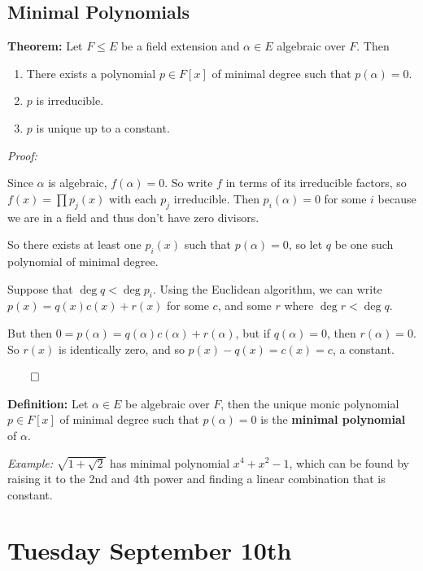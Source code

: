 \hypertarget{minimal-polynomials}{%
\subsection{Minimal Polynomials}\label{minimal-polynomials}}

\textbf{Theorem:} Let \(F\leq E\) be a field extension and
\(\alpha \in E\) algebraic over \(F\). Then

\begin{enumerate}
\def\labelenumi{\arabic{enumi}.}
\item
  There exists a polynomial \(p\in F[x]\) of minimal degree such that
  \(p(\alpha) = 0\).
\item
  \(p\) is irreducible.
\item
  \(p\) is unique up to a constant.
\end{enumerate}

\emph{Proof:}

Since \(\alpha\) is algebraic, \(f(\alpha) = 0\). So write \(f\) in
terms of its irreducible factors, so \(f(x) = \prod p_j(x)\) with each
\(p_j\) irreducible. Then \(p_i(\alpha) = 0\) for some \(i\) because we
are in a field and thus don't have zero divisors.

So there exists at least one \(p_i(x)\) such that \(p(\alpha) = 0\), so
let \(q\) be one such polynomial of minimal degree.

Suppose that \(\deg q < \deg p_i\). Using the Euclidean algorithm, we
can write \(p(x) = q(x) c(x) + r(x)\) for some \(c\), and some \(r\)
where \(\deg r < \deg q\).

But then \(0 = p(\alpha) = q(\alpha)c(\alpha) + r(\alpha)\), but if
\(q(\alpha) = 0\), then \(r(\alpha) = 0\). So \(r(x)\) is identically
zero, and so \(p(x) - q(x) = c(x) = c\), a constant.

\(\qed\)

\textbf{Definition:} Let \(\alpha \in E\) be algebraic over \(F\), then
the unique monic polynomial \(p\in F[x]\) of minimal degree such that
\(p(\alpha) = 0\) is the \textbf{minimal polynomial} of \(\alpha\).

\emph{Example:} \(\sqrt{1 + \sqrt 2}\) has minimal polynomial
\(x^4 + x^2 - 1\), which can be found by raising it to the 2nd and 4th
power and finding a linear combination that is constant.

\hypertarget{tuesday-september-10th}{%
\section{Tuesday September 10th}\label{tuesday-september-10th}}

